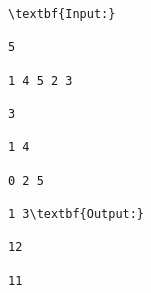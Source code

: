 \begin{verbatim}
\textbf{Input:}

5

1 4 5 2 3

3

1 4

0 2 5

1 3\textbf{Output:}

12

11\end{verbatim}